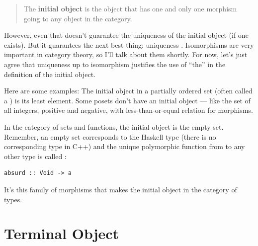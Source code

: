 \begin{quote}
The \textbf{initial object} is the object that has one and only one
morphism going to any object in the category.
\end{quote}

\begin{figure}[H]
\centering
{}
\end{figure}

\noindent
However, even that doesn't guarantee the uniqueness of the initial
object (if one exists). But it guarantees the next best thing:
uniqueness . Isomorphisms are very important in
category theory, so I'll talk about them shortly. For now, let's just
agree that uniqueness up to isomorphism justifies the use of ``the'' in
the definition of the initial object.

Here are some examples: The initial object in a partially ordered set
(often called a ) is its least element. Some posets don't
have an initial object --- like the set of all integers, positive and
negative, with less-than-or-equal relation for morphisms.

In the category of sets and functions, the initial object is the empty
set. Remember, an empty set corresponds to the Haskell type
 (there is no corresponding type in C++) and the unique
polymorphic function from  to any other type is called
:

\begin{Verbatim}[commandchars=\\\{\}]
absurd :: Void -> a
\end{Verbatim}
It's this family of morphisms that makes  the initial
object in the category of types.

\section{Terminal Object}\label{terminal-object}

